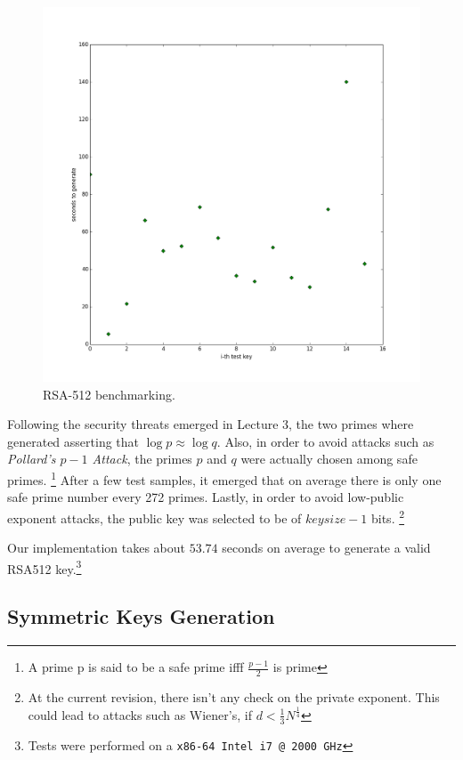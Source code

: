 \documentclass[10pt,a4paper]{report}
\newcommand{\code}[1]{\texttt{#1}}
\begin{document}
\begin{figure}[h!bt]
  \centering
  \includegraphics[scale=.27]{dataset512.png}
  \caption{RSA-512 benchmarking. \label{fig:rsa512}}
\end{figure}


Following the security threats emerged in Lecture 3, the two primes where
generated asserting that \linebreak $\log p \approx \log q$.  Also, in order to
avoid attacks such as \emph{Pollard's $p-1$ Attack}, the primes $p$ and $q$ were
actually chosen among safe primes.
\footnote{A prime p is said to be a safe prime ifff $\frac{p-1}{2}$ is prime}
After a few test samples, it emerged that on average there is only one safe
prime number every 272 primes.
Lastly, in order to avoid low-public exponent attacks, the public key was
selected to be of $keysize - 1$ bits.
\footnote{
  At the current revision, there isn't any check on the private
  exponent. This could lead to attacks such as Wiener's, if
  $ d < \frac{1}{3}N^\frac{1}{4} $}

Our implementation takes about $53.74$ seconds on average to generate a
valid RSA512 key.\footnote{Tests were performed on a \code{x86-64 Intel i7 @ 2000 GHz}}

\subsection{Symmetric Keys Generation}
\end{document}
